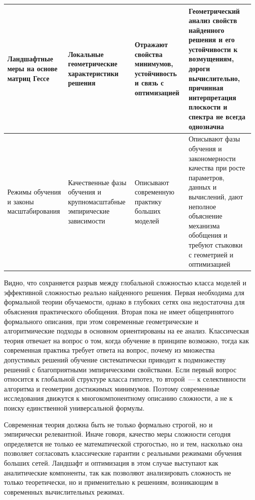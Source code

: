 \begin{table}[htbp]
\begin{tabular}{|>{\raggedright\arraybackslash}m{1.0in}|>{\raggedright\arraybackslash}m{1.15in}|>{\raggedright\arraybackslash}m{1.45in}|>{\raggedright\arraybackslash}m{1.65in}|}
\hline
Ландшафтные меры на основе матриц Гессе & Локальные геометрические характеристики решения & Отражают свойства минимумов, устойчивость и связь с оптимизацией & Геометрический анализ свойств найденного решения и его устойчивости к возмущениям, дороги вычислительно, причинная интерпретация плоскости и спектра не всегда однозначна \\
\hline
Режимы обучения и законы масштабирования & Качественные фазы обучения и крупномасштабные эмпирические зависимости & Описывают современную практику больших моделей & Описывают фазы обучения и закономерности качества при росте параметров, данных и вычислений, дают неполное объяснение механизма обобщения и требуют стыковки с геометрией и оптимизацией \\
\hline
\end{tabular}
\end{table}

Видно, что сохраняется разрыв между глобальной сложностью класса моделей и эффективной сложностью реально найденного решения.
Первая необходима для формальной теории обучаемости, однако в глубоких сетях она недостаточна для объяснения практического обобщения.
Вторая пока не имеет общепринятого формального описания, при этом современные геометрические и алгоритмические подходы в основном ориентированы на ее анализ.
Классическая теория отвечает на вопрос о том, когда обучение в принципе возможно, тогда как современная практика требует ответа на вопрос, почему из множества допустимых решений обучение систематически приводит к подмножеству решений с благоприятными эмпирическими свойствами.
Если первый вопрос относится к глобальной структуре класса гипотез, то второй~--- к селективности алгоритма и геометрии достижимых минимумов.
Поэтому современные исследования движутся к многокомпонентному описанию сложности, а не к поиску единственной универсальной формулы.

Современная теория должна быть не только формально строгой, но и эмпирически релевантной.
Иначе говоря, качество меры сложности сегодня определяется не только ее математической строгостью, но и тем, насколько она позволяет согласовать классические гарантии с реальными режимами обучения больших сетей.
Ландшафт и оптимизация в этом случае выступают как аналитические компоненты, так как позволяют анализировать сложность не только теоретически, но и применительно к решениям, возникающим в современных вычислительных режимах.


